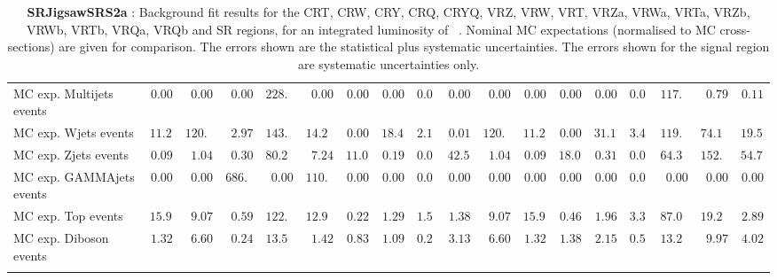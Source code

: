 \begin{table}
{\begin{tabular*}{\textwidth}{@{\extracolsep{\fill}}lrrrrrrrrrrrrrrrrr}
\noalign{\smallskip}\hline\noalign{\smallskip}
        MC exp. Multijets events         & $0.00$          & $0.00$          & $0.00$          & $228.27$          & $0.00$          & $0.00$          & $0.00$          & $0.00$          & $0.00$          & $0.00$          & $0.00$          & $0.00$          & $0.00$          & $0.00$          & $117.97$          & $0.79$          & $0.11$              \\
        MC exp. Wjets events         & $11.24$          & $120.96$          & $2.97$          & $143.24$          & $14.21$          & $0.00$          & $18.48$          & $2.18$          & $0.01$          & $120.96$          & $11.24$          & $0.00$          & $31.12$          & $3.40$          & $119.92$          & $74.16$          & $19.58$              \\
        MC exp. Zjets events         & $0.09$          & $1.04$          & $0.30$          & $80.29$          & $7.24$          & $11.05$          & $0.19$          & $0.02$          & $42.54$          & $1.04$          & $0.09$          & $18.05$          & $0.31$          & $0.03$          & $64.30$          & $152.63$          & $54.77$              \\
        MC exp. GAMMAjets events         & $0.00$          & $0.00$          & $686.01$          & $0.00$          & $110.42$          & $0.00$          & $0.00$          & $0.00$          & $0.00$          & $0.00$          & $0.00$          & $0.00$          & $0.00$          & $0.00$          & $0.00$          & $0.00$          & $0.00$              \\
        MC exp. Top events         & $15.95$          & $9.07$          & $0.59$          & $122.17$          & $12.91$          & $0.22$          & $1.29$          & $1.51$          & $1.38$          & $9.07$          & $15.95$          & $0.46$          & $1.96$          & $3.35$          & $87.09$          & $19.26$          & $2.89$              \\
        MC exp. Diboson events         & $1.32$          & $6.60$          & $0.24$          & $13.53$          & $1.42$          & $0.83$          & $1.09$          & $0.23$          & $3.13$          & $6.60$          & $1.32$          & $1.38$          & $2.15$          & $0.53$          & $13.27$          & $9.97$          & $4.02$              \\
\noalign{\smallskip}\hline\noalign{\smallskip}
\end{tabular*}
}
\caption{{\bf SRJigsawSRS2a} : Background fit results for the CRT, CRW, CRY, CRQ, CRYQ, VRZ, VRW, VRT, VRZa, VRWa, VRTa, VRZb, VRWb, VRTb, VRQa, VRQb and SR regions, for an integrated luminosity of \ourintlumi~\ifb. Nominal MC expectations (normalised to MC cross-sections) are given for comparison. The errors shown are the statistical plus systematic uncertainties. The errors shown for the signal region are systematic uncertainties only.}
\label{table.results.systematics.in.logL.fit.CRT.CRW.CRY.CRQ.CRYQ.VRZ.VRW.VRT.VRZa.VRWa.VRTa.VRZb.VRWb.VRTb.VRQa.VRQb.SR.SRJigsawSRS2a}
\end{table}
%
